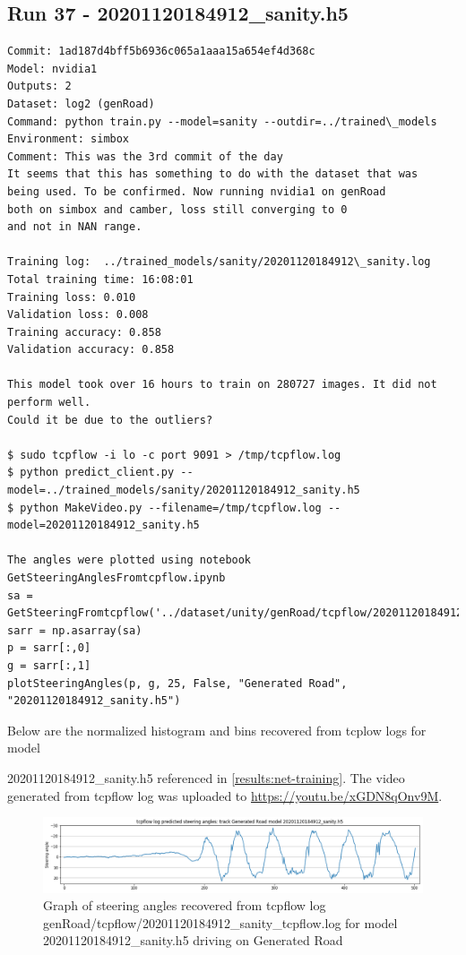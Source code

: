 \subsection{Run 37 - 20201120184912\_sanity.h5}
\label{app_res:37}
\begin{verbatim}
Commit: 1ad187d4bff5b6936c065a1aaa15a654ef4d368c
Model: nvidia1
Outputs: 2
Dataset: log2 (genRoad)
Command: python train.py --model=sanity --outdir=../trained\_models
Environment: simbox
Comment: This was the 3rd commit of the day
It seems that this has something to do with the dataset that was
being used. To be confirmed. Now running nvidia1 on genRoad
both on simbox and camber, loss still converging to 0
and not in NAN range. 

Training log:  ../trained_models/sanity/20201120184912\_sanity.log
Total training time: 16:08:01
Training loss: 0.010
Validation loss: 0.008
Training accuracy: 0.858
Validation accuracy: 0.858

This model took over 16 hours to train on 280727 images. It did not perform well.
Could it be due to the outliers?

$ sudo tcpflow -i lo -c port 9091 > /tmp/tcpflow.log
$ python predict_client.py --model=../trained_models/sanity/20201120184912_sanity.h5
$ python MakeVideo.py --filename=/tmp/tcpflow.log --model=20201120184912_sanity.h5

The angles were plotted using notebook GetSteeringAnglesFromtcpflow.ipynb
sa = GetSteeringFromtcpflow('../dataset/unity/genRoad/tcpflow/20201120184912_sanity.log')
sarr = np.asarray(sa)
p = sarr[:,0]
g = sarr[:,1]
plotSteeringAngles(p, g, 25, False, "Generated Road", "20201120184912_sanity.h5")

\end{verbatim}
Below are the normalized histogram and bins recovered from tcplow logs for model  
  
20201120184912\_sanity.h5 referenced in \ref{results:net-training}. The video generated from tcpflow log was uploaded to \url{https://youtu.be/xGDN8qOnv9M}.

\begin{figure}[ht]
 \centering 
 \includegraphics[width=\textwidth]{Figures/tcpflow_20201120184912_sanity_graph.png}
 \caption{Graph of steering angles recovered from tcpflow log genRoad/tcpflow/20201120184912\_sanity\_tcpflow.log for model 20201120184912\_sanity.h5 driving on Generated Road}
 \label{fig:tcpflow_20201120184912_graph}
\end{figure}

